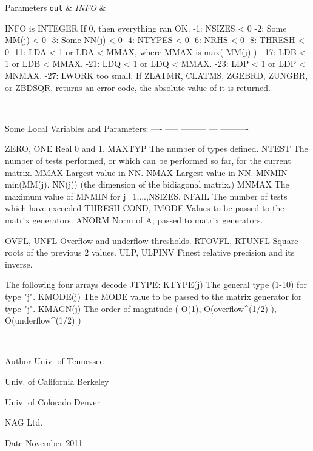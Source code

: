 \begin{DoxyParams}[1]{Parameters}
\hline
\mbox{\tt out}  & {\em I\+N\+F\+O} & \begin{DoxyVerb}          INFO is INTEGER
          If 0, then everything ran OK.
           -1: NSIZES < 0
           -2: Some MM(j) < 0
           -3: Some NN(j) < 0
           -4: NTYPES < 0
           -6: NRHS  < 0
           -8: THRESH < 0
          -11: LDA < 1 or LDA < MMAX, where MMAX is max( MM(j) ).
          -17: LDB < 1 or LDB < MMAX.
          -21: LDQ < 1 or LDQ < MMAX.
          -23: LDP < 1 or LDP < MNMAX.
          -27: LWORK too small.
          If  ZLATMR, CLATMS, ZGEBRD, ZUNGBR, or ZBDSQR,
              returns an error code, the
              absolute value of it is returned.

-----------------------------------------------------------------------

     Some Local Variables and Parameters:
     ---- ----- --------- --- ----------

     ZERO, ONE       Real 0 and 1.
     MAXTYP          The number of types defined.
     NTEST           The number of tests performed, or which can
                     be performed so far, for the current matrix.
     MMAX            Largest value in NN.
     NMAX            Largest value in NN.
     MNMIN           min(MM(j), NN(j)) (the dimension of the bidiagonal
                     matrix.)
     MNMAX           The maximum value of MNMIN for j=1,...,NSIZES.
     NFAIL           The number of tests which have exceeded THRESH
     COND, IMODE     Values to be passed to the matrix generators.
     ANORM           Norm of A; passed to matrix generators.

     OVFL, UNFL      Overflow and underflow thresholds.
     RTOVFL, RTUNFL  Square roots of the previous 2 values.
     ULP, ULPINV     Finest relative precision and its inverse.

             The following four arrays decode JTYPE:
     KTYPE(j)        The general type (1-10) for type "j".
     KMODE(j)        The MODE value to be passed to the matrix
                     generator for type "j".
     KMAGN(j)        The order of magnitude ( O(1),
                     O(overflow^(1/2) ), O(underflow^(1/2) )\end{DoxyVerb}
 \\
\hline
\end{DoxyParams}
\begin{DoxyAuthor}{Author}
Univ. of Tennessee 

Univ. of California Berkeley 

Univ. of Colorado Denver 

N\+A\+G Ltd. 
\end{DoxyAuthor}
\begin{DoxyDate}{Date}
November 2011 
\end{DoxyDate}
\hypertarget{group__complex16__eig_ga2497b5e3c907b7b142fdc6a9f1fb6e84}{}
